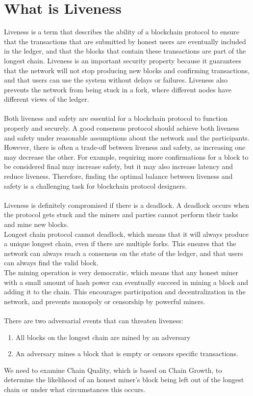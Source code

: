 \documentclass{report}
\begin{document}
\section{What is Liveness}
Liveness is a term that describes the ability of a blockchain protocol to ensure that the transactions that are submitted by honest users are eventually included in the ledger, and that the blocks that contain these transactions are part of the longest chain. Liveness is an important security property because it guarantees that the network will not stop producing new blocks and confirming transactions, and that users can use the system without delays or failures. Liveness also prevents the network from being stuck in a fork, where different nodes have different views of the ledger.\\\\
Both liveness and safety are essential for a blockchain protocol to function properly and securely. A good consensus protocol should achieve both liveness and safety under reasonable assumptions about the network and the participants. However, there is often a trade-off between liveness and safety, as increasing one may decrease the other. For example, requiring more confirmations for a block to be considered final may increase safety, but it may also increase latency and reduce liveness. Therefore, finding the optimal balance between liveness and safety is a challenging task for blockchain protocol designers.\\\\
Liveness is definitely compromised if there is a deadlock. A deadlock occurs when the protocol gets stuck and the miners and parties cannot perform their tasks and mine new blocks.\\
 Longest chain protocol cannot deadlock, which means that it will always produce a unique longest chain, even if there are multiple forks. This ensures that the network can always reach a consensus on the state of the ledger, and that users can always find the valid block.\\
The mining operation is very democratic, which means that any honest miner with a small amount of hash power can eventually succeed in mining a block and adding it to the chain. This encourages participation and decentralization in the network, and prevents monopoly or censorship by powerful miners.\\\\
There are two adversarial events that can threaten liveness:
\begin{enumerate}
	\item All blocks on the longest chain are mined by an adversary
	\item An adversary mines a block that is empty or censors specific transactions.
\end{enumerate} 
We need to examine Chain Quality, which is based on Chain Growth, to determine the likelihood of an honest miner’s block being left out of the longest chain or under what circumstances this occurs.
\end{document}
